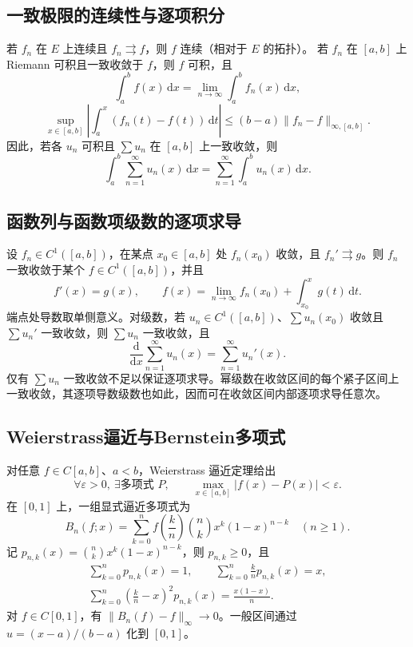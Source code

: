 \documentclass[../main.tex]{subfiles}
\begin{document}
\subsection{一致极限的连续性与逐项积分}
若 $f_n$ 在 $E$ 上连续且 $f_n\rightrightarrows f$，则 $f$ 连续（相对于 $E$ 的拓扑）。
若 $f_n$ 在 $[a,b]$ 上 Riemann 可积且一致收敛于 $f$，则 $f$ 可积，且
\[
\int_a^bf(x)\,\mathrm dx=\lim_{n\to\infty}\int_a^bf_n(x)\,\mathrm dx,
\]
\[
\sup_{x\in[a,b]}\left|\int_a^x(f_n(t)-f(t))\,\mathrm dt\right|
\le(b-a)\|f_n-f\|_{\infty,[a,b]}.
\]
因此，若各 $u_n$ 可积且 $\sum u_n$ 在 $[a,b]$ 上一致收敛，则
\[
\int_a^b\sum_{n=1}^\infty u_n(x)\,\mathrm dx
=\sum_{n=1}^\infty\int_a^bu_n(x)\,\mathrm dx.
\]
\par\pagebreak[0]\begin{samepage}
\subsection{函数列与函数项级数的逐项求导}
设 $f_n\in C^1([a,b])$，在某点 $x_0\in[a,b]$ 处 $f_n(x_0)$ 收敛，且 $f_n'\rightrightarrows g$。则 $f_n$ 一致收敛于某个 $f\in C^1([a,b])$，并且
\[
f'(x)=g(x),\qquad
f(x)=\lim_{n\to\infty}f_n(x_0)+\int_{x_0}^xg(t)\,\mathrm dt.
\]
端点处导数取单侧意义。对级数，若 $u_n\in C^1([a,b])$、$\sum u_n(x_0)$ 收敛且 $\sum u_n'$ 一致收敛，则 $\sum u_n$ 一致收敛，且
\[
\frac{\mathrm d}{\mathrm dx}\sum_{n=1}^\infty u_n(x)
=\sum_{n=1}^\infty u_n'(x).
\]
仅有 $\sum u_n$ 一致收敛不足以保证逐项求导。幂级数在收敛区间的每个紧子区间上一致收敛，其逐项导数级数也如此，因而可在收敛区间内部逐项求导任意次。
\par\end{samepage}\pagebreak[0]
\subsection{Weierstrass逼近与Bernstein多项式}
对任意 $f\in C[a,b]$、$a<b$，Weierstrass 逼近定理给出
\[
\forall\varepsilon>0,\ \exists\text{多项式 }P,\qquad
\max_{x\in[a,b]}|f(x)-P(x)|<\varepsilon.
\]
在 $[0,1]$ 上，一组显式逼近多项式为
\[
B_n(f;x)=\sum_{k=0}^nf\!\left(\frac kn\right)
\binom nk x^k(1-x)^{n-k}\quad(n\ge1).
\]
记 $p_{n,k}(x)=\binom nk x^k(1-x)^{n-k}$，则 $p_{n,k}\ge0$，且
\begin{gather*}
\sum_{k=0}^np_{n,k}(x)=1,\qquad
\sum_{k=0}^n\frac kn p_{n,k}(x)=x,\\
\sum_{k=0}^n\left(\frac kn-x\right)^2p_{n,k}(x)=\frac{x(1-x)}n.
\end{gather*}
对 $f\in C[0,1]$，有 $\|B_n(f)-f\|_\infty\to0$。一般区间通过 $u=(x-a)/(b-a)$ 化到 $[0,1]$。
\end{document}
